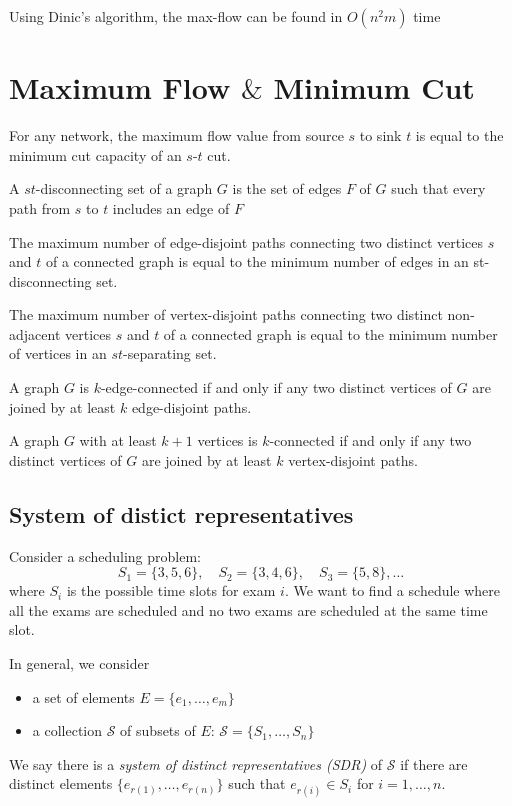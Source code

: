 Using Dinic’s algorithm, the max-flow can be found in $O(n^2m)$ time

\section{Maximum Flow $\&$ Minimum Cut}
\begin{theorem}
For any network, the maximum flow value from source $s$ to sink $t$ is equal to the minimum cut capacity of an $s$-$t$ cut.
\end{theorem}

\begin{definition}
A $st$-disconnecting set of a graph $G$ is the set of edges $F$ of $G$ such that every path from $s$ to $t$ includes an edge of $F$
\end{definition}

\begin{theorem}
The maximum number of edge-disjoint paths connecting two distinct vertices $s$ and $t$ of a connected graph is equal to the minimum number of edges in an st-disconnecting set.
\end{theorem}
\begin{theorem}
The maximum number of vertex-disjoint paths connecting two distinct non-adjacent vertices $s$ and $t$ of a connected graph is equal to the minimum number of vertices in an $st$-separating set.
\end{theorem}

\begin{theorem}
A graph $G$ is $k$-edge-connected if and only if any two distinct vertices of $G$ are joined by at least $k$ edge-disjoint paths.
\end{theorem}

\begin{theorem}
A graph $G$ with at least $k + 1$ vertices is $k$-connected if and only if any two distinct vertices of $G$ are joined by at least $k$ vertex-disjoint paths.
\end{theorem}

\subsection{System of distict representatives}
Consider a scheduling problem:
\[
S_1=\{3,5,6\},\quad
S_2=\{3,4,6\},\quad
S_3=\{5,8\},\dots
\]
where $S_i$ is the possible time slots for exam $i$.
We want to find a schedule where all the exams are scheduled and no two exams are scheduled at the same time slot.
\begin{definition}[SDR]
In general, we consider
\begin{itemize}
\item
a set of elements $E=\{e_1,\dots,e_m\}$
\item
a collection $\mathcal{S}$ of subsets of $E$: $\mathcal{S}=\{S_1,\dots,S_n\}$
\end{itemize}
We say there is a \emph{system of distinct representatives (SDR)} of $\mathcal{S}$ if there are distinct elements $\{e_{r(1)},\dots,e_{r(n)}\}$ such that $e_{r(i)}\in S_i$ for $i=1,\dots,n$.
\end{definition}

